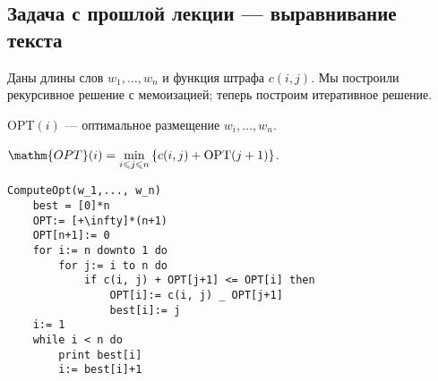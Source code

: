 \subsection{Задача с прошлой лекции --- выравнивание текста}

Даны длины слов $w_1,\ldots, w_n$ и функция штрафа $c(i, j)$. Мы построили рекурсивное решение с мемоизацией; теперь построим итеративное решение.

OPT$(i)$ --- оптимальное размещение $w_i, \ldots, w_n$.

$\mathm{OPT}(i) = \min\limits_{i\leqslant j\leqslant n} \left\{ c(i, j)+ \mathrm{OPT}(j+1) \right\}$.

\begin{lstlisting}
ComputeOpt(w_1,..., w_n)
    best = [0]*n
    OPT:= [+\infty]*(n+1)
    OPT[n+1]:= 0
    for i:= n downto 1 do
        for j:= i to n do
            if c(i, j) + OPT[j+1] <= OPT[i] then
                OPT[i]:= c(i, j) _ OPT[j+1]
                best[i]:= j
    i:= 1
    while i < n do
        print best[i]
        i:= best[i]+1
\end{lstlisting}

